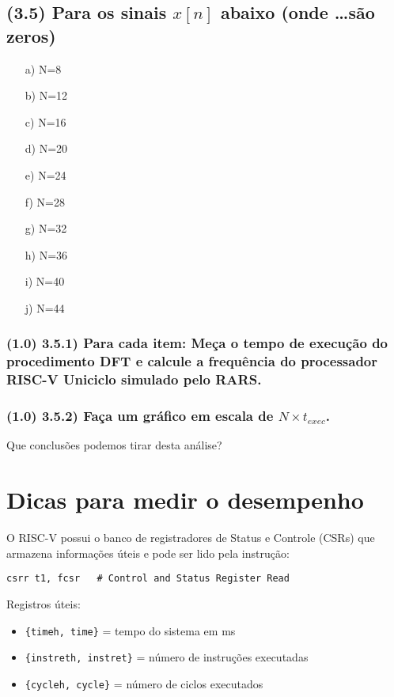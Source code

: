 \documentclass[12pt,a4paper]{article}
\begin{document}
\subsection*{(3.5) Para os sinais $x[n]$ abaixo (onde \dots são zeros)}
\begin{enumerate}
    \item[a)] N=8
    \item[b)] N=12
    \item[c)] N=16
    \item[d)] N=20
    \item[e)] N=24
    \item[f)] N=28
    \item[g)] N=32
    \item[h)] N=36
    \item[i)] N=40
    \item[j)] N=44
\end{enumerate}

\subsubsection*{(1.0) 3.5.1) Para cada item: Meça o tempo de execução do procedimento DFT e calcule a frequência do processador RISC-V Uniciclo simulado pelo RARS.}
\subsubsection*{(1.0) 3.5.2) Faça um gráfico em escala de $N \times t_{exec}$.}
Que conclusões podemos tirar desta análise?

\newpage
\section*{Dicas para medir o desempenho}
O RISC-V possui o banco de registradores de Status e Controle (CSRs) que armazena informações úteis e pode ser lido pela instrução:
\begin{verbatim}
csrr t1, fcsr   # Control and Status Register Read
\end{verbatim}
Registros úteis:
\begin{itemize}
    \item \texttt{\{timeh, time\}} = tempo do sistema em ms
    \item \texttt{\{instreth, instret\}} = número de instruções executadas
    \item \texttt{\{cycleh, cycle\}} = número de ciclos executados
\end{itemize}
\end{document}

